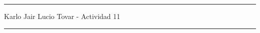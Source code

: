 \documentclass[12pt]{article}
\begin{document}
\hrule
\begin{center}
    Karlo Jair Lucio Tovar - Actividad 11\\
\end{center}
\hrule
\vspace*{.8cm}


\end{document}
